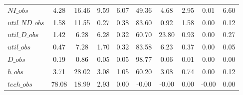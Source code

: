 \begin{center}
\begin{longtable}{lccccccccc}
$NI\_obs        $	 & 	         4.28	 & 	        16.46	 & 	         9.59	 & 	         6.07	 & 	        49.36	 & 	         4.68	 & 	         2.95	 & 	         0.01	 & 	         6.60 \\ 
$util\_ND\_obs  $	 & 	         1.58	 & 	        11.55	 & 	         0.27	 & 	         0.38	 & 	        83.60	 & 	         0.92	 & 	         1.58	 & 	         0.00	 & 	         0.12 \\ 
$util\_D\_obs   $	 & 	         1.42	 & 	         6.28	 & 	         6.28	 & 	         0.32	 & 	        60.70	 & 	        23.80	 & 	         0.93	 & 	         0.00	 & 	         0.27 \\ 
$util\_obs      $	 & 	         0.47	 & 	         7.28	 & 	         1.70	 & 	         0.32	 & 	        83.58	 & 	         6.23	 & 	         0.37	 & 	         0.00	 & 	         0.05 \\ 
$D\_obs         $	 & 	         0.19	 & 	         0.86	 & 	         0.05	 & 	         0.05	 & 	        98.77	 & 	         0.06	 & 	         0.01	 & 	         0.00	 & 	         0.00 \\ 
$h\_obs         $	 & 	         3.71	 & 	        28.02	 & 	         3.08	 & 	         1.05	 & 	        60.20	 & 	         3.08	 & 	         0.74	 & 	         0.00	 & 	         0.12 \\ 
$tech\_obs      $	 & 	        78.08	 & 	        18.99	 & 	         2.93	 & 	         0.00	 & 	        -0.00	 & 	        -0.00	 & 	         0.00	 & 	        -0.00	 & 	         0.00 \\ 
\end{longtable}
 \end{center}
